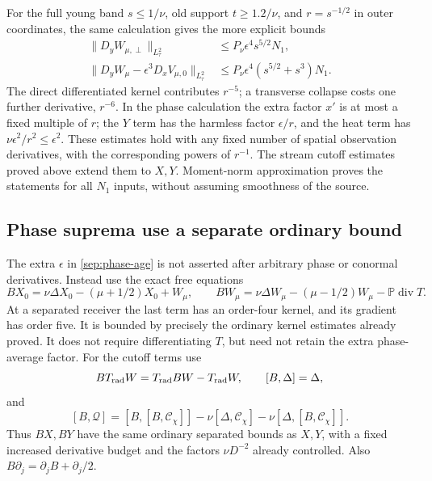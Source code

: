 For the full young band $s\le1/\nu$, old support $t\ge1.2/\nu$,
and $r=s^{-1/2}$ in outer coordinates, the same calculation gives
the more explicit bounds
\begin{align}
 \|D_yW_{\mu,\perp}\|_{L^2_\tau}
     &\le P_\nu\epsilon^4s^{5/2}N_1,\label{sep:phase-age}\\
 \|D_yW_\mu-\epsilon^3D_xV_{\mu,0}\|_{L^2_\tau}
     &\le P_\nu\epsilon^4(s^{5/2}+s^3)N_1.
 \label{sep:mean-age}
\end{align}
The direct differentiated kernel contributes $r^{-5}$; a transverse
collapse costs one further derivative, $r^{-6}$. In the phase
calculation the extra factor $x'$ is at most a fixed multiple of $r$;
the $Y$ term has the harmless factor $\epsilon/r$, and the heat term
has $\nu\epsilon^2/r^2\le\epsilon^2$.
These estimates hold with any fixed number of spatial observation
derivatives, with the corresponding powers of $r^{-1}$.
The stream cutoff estimates proved above extend them to $X,Y$.
Moment-norm approximation proves the statements for all $N_1$ inputs,
without assuming smoothness of the source.

\subsection{Phase suprema use a separate ordinary bound}

The extra $\epsilon$ in \eqref{sep:phase-age} is not asserted after
arbitrary phase or conormal derivatives. Instead use the exact free
equations
\[
 BX_0=\nu\Delta X_0-(\mu+1/2)X_0+W_\mu,
 \qquad
 BW_\mu=\nu\Delta W_\mu-(\mu-1/2)W_\mu
                                  -\mathbb P\operatorname{div}T.
\]
At a separated receiver the last term has an order-four kernel, and
its gradient has order five. It is bounded by precisely the ordinary
kernel estimates already proved. It does not require differentiating
$T$, but need not retain the extra phase-average factor.
For the cutoff terms use
\[
 BT_{\rm rad}W=T_{\rm rad}BW-T_{\rm rad}W,
 \qquad [B,\Delta]=\Delta,
\]
and
\[
 [B,\mathcal Q]=[B,[B,\mathcal C_\chi]]
 -\nu[\Delta,\mathcal C_\chi]
 -\nu[\Delta,[B,\mathcal C_\chi]].
\]
Thus $BX,BY$ have the same ordinary separated bounds as $X,Y$,
with a fixed increased derivative budget and the factors
$\nu D^{-2}$ already controlled. Also
$B\partial_j=\partial_jB+\partial_j/2$.

